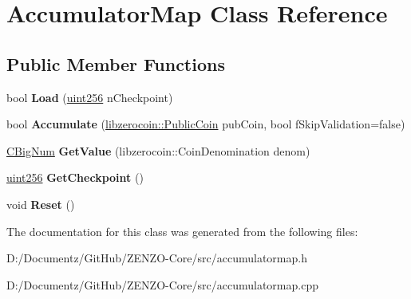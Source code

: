 \hypertarget{class_accumulator_map}{}\section{Accumulator\+Map Class Reference}
\label{class_accumulator_map}
\subsection*{Public Member Functions}
\begin{DoxyCompactItemize}
\item 
\mbox{\label{class_accumulator_map_a555952cd361c42cc880d4e6dc612f5de}} 
bool {\bfseries Load} (\mbox{\hyperlink{classuint256}{uint256}} n\+Checkpoint)
\item 
\mbox{\label{class_accumulator_map_a4367ebb7451f2140eaf7c38de1d07f94}} 
bool {\bfseries Accumulate} (\mbox{\hyperlink{classlibzerocoin_1_1_public_coin}{libzerocoin\+::\+Public\+Coin}} pub\+Coin, bool f\+Skip\+Validation=false)
\item 
\mbox{\label{class_accumulator_map_a51085c95a5d7162e0f834c13d3b42acc}} 
\mbox{\hyperlink{class_c_big_num}{C\+Big\+Num}} {\bfseries Get\+Value} (libzerocoin\+::\+Coin\+Denomination denom)
\item 
\mbox{\label{class_accumulator_map_ad5fc3075ad1492f352266a287d8282ef}} 
\mbox{\hyperlink{classuint256}{uint256}} {\bfseries Get\+Checkpoint} ()
\item 
\mbox{\label{class_accumulator_map_a82bbe7e99ebf4d39bf40450392b8d772}} 
void {\bfseries Reset} ()
\end{DoxyCompactItemize}


The documentation for this class was generated from the following files\+:\begin{DoxyCompactItemize}
\item 
D\+:/\+Documentz/\+Git\+Hub/\+Z\+E\+N\+Z\+O-\/\+Core/src/accumulatormap.\+h\item 
D\+:/\+Documentz/\+Git\+Hub/\+Z\+E\+N\+Z\+O-\/\+Core/src/accumulatormap.\+cpp\end{DoxyCompactItemize}

